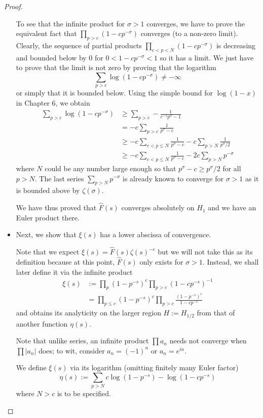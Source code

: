 \documentclass[12pt]{article}
\newcommand{\Fhat}{\widehat{F}}
\begin{document}
\begin{proof}
\begin{itemize}
To see that the infinite product for $\sigma > 1$ converges, we have to prove the equivalent fact that $\prod_{p > c} (1 - c p^{-\sigma})$ converges (to a non-zero limit). Clearly, the sequence of partial products $\prod_{c < p < N} (1 - c p^{-\sigma})$ is decreasing and bounded below by 0 for $0 < 1 - c p^{-\sigma} < 1$ so it has a limit. We just have to prove that the limit is not zero by proving that the logarithm
$$\sum_{p > c} \log(1 - c p^{-\sigma}) \not= -\infty$$
or simply that it is bounded below. Using the simple bound for $\log(1 - x)$ in Chapter 6, we obtain
\begin{align*}
\sum_{p > c} \log(1 - c p^{-\sigma}) &\geq \sum_{p > c} - \frac{1}{c^{-1} p^\sigma - 1}\\
&= - c \sum_{p > c} \frac{1}{p^\sigma - c}\\
&\geq -c \sum_{c < p \leq N} \frac{1}{p^\sigma - c} - c \sum_{p > N} \frac{1}{p^\sigma / 2} \\
&\geq -c \sum_{c < p \leq N} \frac{1}{p^\sigma - c} - 2 c \sum_{p > N} p^{-\sigma}
\end{align*}
where $N$ could be any number large enough so that $p^{\sigma} - c \geq p^{\sigma}/2$ for all $p > N$. The last series $\sum_{p > N} p^{-\sigma}$ is already known to converge for $\sigma > 1$ as it is bounded above by $\zeta(\sigma)$.

We have thus proved that $\Fhat(s)$ converges absolutely on $H_1$ and we have an Euler product there.

\item Next, we show that $\xi(s)$ has a lower abscissa of convergence.

Note that we expect $ \xi(s) = \Fhat(s) \zeta(s)^{-c}$ but we will not take this as its definition because at this point, $\Fhat(s)$ only exists for $\sigma > 1$. Instead, we shall later define it via the infinite product
\begin{align*}
\xi(s) &:= \prod_p (1 - p^{-s})^c \prod_{p > c} (1 - cp^{-s})^{-1}\\
&= \prod_{p \leq c} (1 - p^{-s})^c \prod_{p > c} \frac{(1 - p^{-s})^c}{1 - cp^{-s}}
\end{align*}
and obtains its analyticity on the larger region $H := H_{1/2}$ from that of another function $\eta(s)$.

Note that unlike series, an infinite product $\prod a_n$ needs not converge when $\prod |a_n|$ does; to wit, consider $a_n = (-1)^n$ or $a_n = e^{in}$.

We define $\xi(s)$ via its logarithm (omitting finitely many Euler factor)
$$\eta(s) := \sum_{p > N} c \log(1 - p^{-s}) - \log(1 - cp^{-s})$$
where $N > c$ is to be specified.


\end{itemize}
\end{proof}
\end{document}
